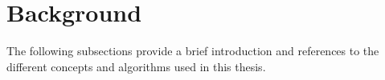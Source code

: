 \section{Background}
\label{sec:background}
The following subsections provide a brief introduction and references to the different concepts and algorithms used in this thesis.









